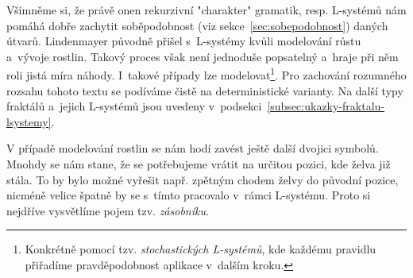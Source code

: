 Všimněme si, že právě onen rekurzivní "charakter" gramatik, resp. L-systémů nám pomáhá dobře zachytit soběpodobnost (viz sekce~\ref{sec:sobepodobnost}) daných útvarů. Lindenmayer původně přišel s~L-systémy kvůli modelování růstu a~vývoje rostlin. Takový proces však není jednoduše popsatelný a~hraje při něm roli jistá míra náhody. \cite{Prusinkiewicz1990} I~takové případy lze modelovat\footnote{Konkrétně pomocí tzv. \emph{stochastických L-systémů}, kde každému pravidlu přiřadíme pravděpodobnost aplikace v~dalším kroku.}. Pro zachování rozumného rozsahu tohoto textu se podíváme čistě na deterministické varianty. Na další typy fraktálů a~jejich L-systémů jsou uvedeny v~podsekci~\ref{subsec:ukazky-fraktalu-lsystemy}.

V případě modelování rostlin se nám hodí zavést ještě další dvojici symbolů. Mnohdy se nám stane, že se potřebujeme vrátit na určitou pozici, kde želva již stála. To by bylo možné vyřešit např. zpětným chodem želvy do původní pozice, nicméně velice špatně by se s~tímto pracovalo v~rámci L-systému. Proto si nejdříve vysvětlíme pojem tzv. \emph{zásobníku}.

